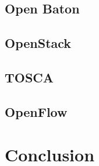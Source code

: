 \subsection{Open Baton}
\doit

\subsection{OpenStack}
\doit

\subsection{TOSCA}
\doit

\subsection{OpenFlow}
\doit

\section{Conclusion}
\doit

